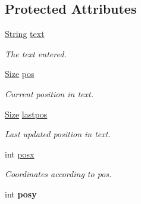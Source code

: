 \subsection*{Protected Attributes}
\begin{DoxyCompactItemize}
\item 
\hypertarget{classGUI_1_1Input_af00a3f739e0695bfbdeeb4962b4b3b65}{\hyperlink{classGUI_1_1String}{String} \hyperlink{classGUI_1_1Input_af00a3f739e0695bfbdeeb4962b4b3b65}{text}}\label{classGUI_1_1Input_af00a3f739e0695bfbdeeb4962b4b3b65}

\begin{DoxyCompactList}\small\item\em The text entered. \end{DoxyCompactList}\item 
\hypertarget{classGUI_1_1Input_a2196b6b2b47846639191c9664d338446}{\hyperlink{namespaceGUI_a10b6232e08729baa0bd211a86a69ce36}{Size} \hyperlink{classGUI_1_1Input_a2196b6b2b47846639191c9664d338446}{pos}}\label{classGUI_1_1Input_a2196b6b2b47846639191c9664d338446}

\begin{DoxyCompactList}\small\item\em Current position in {\itshape text\/}. \end{DoxyCompactList}\item 
\hypertarget{classGUI_1_1Input_a1072ce4e75ed8ca4a2b96af63f43a0cd}{\hyperlink{namespaceGUI_a10b6232e08729baa0bd211a86a69ce36}{Size} \hyperlink{classGUI_1_1Input_a1072ce4e75ed8ca4a2b96af63f43a0cd}{lastpos}}\label{classGUI_1_1Input_a1072ce4e75ed8ca4a2b96af63f43a0cd}

\begin{DoxyCompactList}\small\item\em Last updated position in {\itshape text\/}. \end{DoxyCompactList}\item 
\hypertarget{classGUI_1_1Input_a7ff39d7ca64139b43df694d63196deca}{int \hyperlink{classGUI_1_1Input_a7ff39d7ca64139b43df694d63196deca}{posx}}\label{classGUI_1_1Input_a7ff39d7ca64139b43df694d63196deca}

\begin{DoxyCompactList}\small\item\em Coordinates according to pos. \end{DoxyCompactList}\item 
\hypertarget{classGUI_1_1Input_aa3713bd1a58efc45f87c99c401b4144a}{int {\bfseries posy}}\label{classGUI_1_1Input_aa3713bd1a58efc45f87c99c401b4144a}


\end{DoxyCompactItemize}
